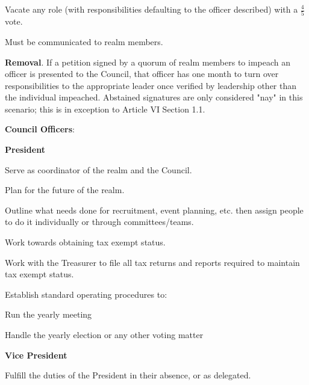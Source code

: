 \documentclass[12pt]{article}
\begin{document}
\begin{level}
\begin{level}
\begin{level}
\begin{level}
                \end{level}
                \item Vacate any role (with responsibilities defaulting to the officer described) with a \(\frac{4}{5}\) vote.
                \begin{level}
                    \item Must be communicated to realm members.
                \end{level}
            \end{level}
        \item \textbf{Removal}. If a petition signed by a quorum of realm members to impeach an officer is presented to the Council, that officer has one month to turn over responsibilities to the appropriate leader once verified by leadership other than the individual impeached. Abstained signatures are only considered "nay" in this scenario; this is in exception to Article VI Section 1.1.
    \end{level}
    \item \textbf{Council Officers}:
    \begin{level}
    \item \textbf{President}
        \begin{level}
            \item Serve as coordinator of the realm and the Council.
            \item Plan for the future of the realm. 
            \item Outline what needs done for recruitment, event planning, etc. then assign people to do it individually or through committees/teams.
            \item Work towards obtaining tax exempt status.
            \item Work with the Treasurer to file all tax returns and reports required to maintain tax exempt status.
            \item Establish standard operating procedures to:
            \begin{level}
                \item Run the yearly meeting
                \item Handle the yearly election or any other voting matter
            \end{level}
        \end{level}
        \item \textbf{Vice President}
        \begin{level}
            \item Fulfill the duties of the President in their absence, or as delegated.

\end{level}
\end{level}
\end{level}
\end{document}

